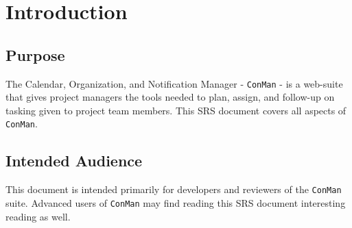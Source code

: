 \documentclass{article}
\begin{document}

\normalsize

\newpage
\tableofcontents

\newpage
\section{Introduction}
\subsection{Purpose}
The Calendar, Organization, and Notification Manager - \texttt{ConMan} - is a web-suite that gives project managers the tools needed to plan, assign, and follow-up on tasking given to project team members.  This SRS document covers all aspects of \texttt{ConMan}.



\subsection{Intended Audience} %
This document is intended primarily for developers and reviewers of the \texttt{ConMan} suite.  
Advanced users of \texttt{ConMan} may find reading this SRS document interesting reading as well.
\end{document}
